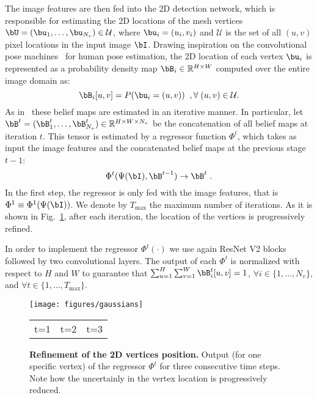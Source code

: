 \documentclass[10pt,twocolumn,letterpaper]{article}
\begin{document}
The image features are then fed into the 2D detection network, which is responsible for estimating the 2D locations of the mesh vertices  $\bU=(\bu_1,\ldots,\bu_{N_v})\in \mathcal{U}$, where $\bu_i=(u_i,v_i)$ and  $\mathcal{U}$ is the set of all $(u,v)$ pixel locations in the input image $\bI$. Drawing inspiration on the convolutional pose machines~\cite{wei2016cpm} for human pose estimation, the 2D location of each vertex $\bu_i$ is represented as a probability density map $\bB_i\in \mathbb{R}^{H\times W}$ computed over the entire image domain as:
\begin{equation}
\bB_i [u,v]= P(\bu_i = (u,v))\;\;, \forall \; (u,v)\in\mathcal{U} .
\end{equation}
 As in~\cite{wei2016cpm} these belief maps are estimated in an iterative manner. In particular, let $\bB^t=(\bB_1^t,\ldots,\bB_{N_v}^t)\in\mathbb{R}^{H\times W \times N_v}$  be the concatenation of all belief maps at iteration $t$. This tensor is estimated by a regressor function $\Phi^t$, which takes as input the image features and the concatenated belief maps at the previous stage $t-1$:
 \begin{equation}
 \Phi^t(\Psi(\bI),\bB^{t-1}) \rightarrow \bB^t \;.
 \end{equation}
In the first step, the regressor is only fed with the image features, that is $\Phi^{1}\equiv \Phi^{1}(\Psi(\bI))$. We denote by $T_{\textrm{max}}$ the maximum number of iterations. As it is shown in Fig.~\ref{fig:pose_g}, after each iteration, the location of the vertices is progressively refined.

In order to implement the regressor $\Phi^t(\cdot)$ we use again ResNet V2 blocks followed by two convolutional layers. The output of each  $\Phi^t$ is normalized with respect to $H$ and $W$  to guarantee that $\sum_{u=1}^{H}\sum_{v=1}^{W}\bB_i^t[u,v]=1$,  $\forall i \in \{1,\ldots,N_v\}$, and $\forall t \in \{1,\ldots,T_{\textrm{max}}\}$.

\begin{figure}[t!]
	\texttt{[image: figures/gaussians]}	
	\begin{tabular}{p{3cm} p{3cm} p{3cm}}
		\hspace{1cm}t=1& \hspace{0.2cm} t=2 & \hspace{-0.5cm} t=3
		\end{tabular}
	\caption{{\bf Refinement of the 2D vertices position. } Output (for one specific vertex) of the regressor $\Phi^t$  for three consecutive time steps. Note how the uncertainly in the vertex location is progressively reduced. }
	\label{fig:pose_g}	
\end{figure}
\end{document}
